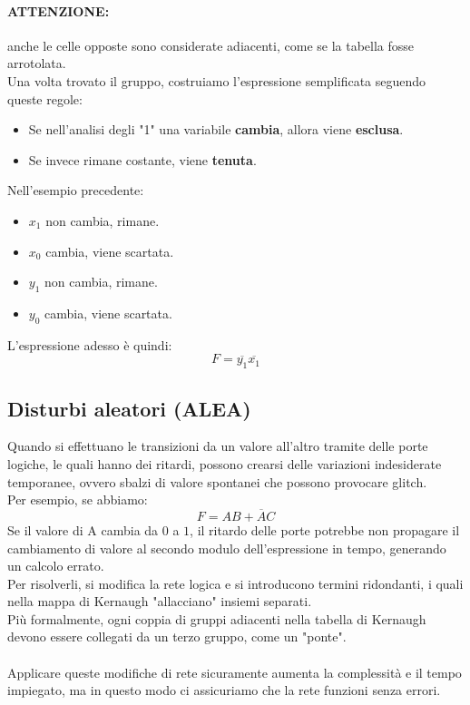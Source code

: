 \documentclass[12pt,a4paper]{article}
\begin{document}
\paragraph{ATTENZIONE:} anche le celle opposte sono considerate adiacenti, come se la tabella fosse arrotolata.\\
Una volta trovato il gruppo, costruiamo l'espressione semplificata seguendo queste regole:
\begin{itemize}
    \item Se nell'analisi degli "1" una variabile \textbf{cambia}, allora viene \textbf{esclusa}.
    \item Se invece rimane costante, viene \textbf{tenuta}.
\end{itemize}
Nell'esempio precedente:
\begin{itemize}
    \item $x_1$ non cambia, rimane.
    \item $x_0$ cambia, viene scartata.
    \item $y_1$ non cambia, rimane.
    \item $y_0$ cambia, viene scartata.
\end{itemize}
L'espressione adesso è quindi:
\[
F = \overline{y_1}\overline{x_1}
\]
\subsection{Disturbi aleatori (ALEA)}
Quando si effettuano le transizioni da un valore all'altro tramite delle porte logiche, le quali hanno dei ritardi, possono crearsi delle variazioni indesiderate temporanee, ovvero sbalzi di valore spontanei che possono provocare glitch.\\
Per esempio, se abbiamo:
\[
F = AB + \overline{A}C
\]
Se il valore di A cambia da $0$ a $1$, il ritardo delle porte potrebbe non propagare il cambiamento di valore al secondo modulo dell'espressione in tempo, generando un calcolo errato.\\
Per risolverli, si modifica la rete logica e si introducono termini ridondanti, i quali nella mappa di Kernaugh "allacciano" insiemi separati.\\
Più formalmente, ogni coppia di gruppi adiacenti nella tabella di Kernaugh devono essere collegati da un terzo gruppo, come un "ponte".\\\\
Applicare queste modifiche di rete sicuramente aumenta la complessità e il tempo impiegato, ma in questo modo ci assicuriamo che la rete funzioni senza errori.
\end{document}
